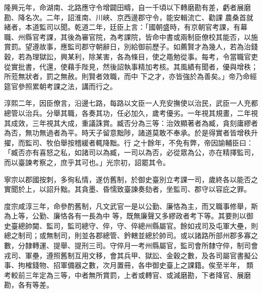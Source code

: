\begin{pinyinscope}
 隆興元年，命湖南、北路應守令增闢田疇，自一千頃以下轉磨勘有差，虧者展磨勘、降名次。二年，詔淮南、川峽、京西邊郡守令，能安輯流亡、勸課
 農桑首就緒者，本道監司以聞。乾道二年，廷臣上言：「國朝盛時，有京朝官考課，有幕職、州縣官考課，其後為審官院，為考課院，皆命中書或兩制臣僚校其能否，以施賞罰。望遵故事，應監司郡守朝辭日，別給御前歷子。如薦賢才為幾人，若為治錢穀，若為理獄訟，興某利，除某害，各為條目，使之黽勉從事。每考，令當職官吏從實批書，代還，使藉手陛見，然後詔執事精加考核。其風績有聞者，優與增秩；所蒞無狀者，罰之無赦。則賢者效職，而中
 下之才，亦皆強於為善矣。」帝乃命經筵官參照累朝考課之法，講而行之。



 淳熙二年，因臣僚言，沿邊七路，每路以文臣一人充安撫使以治民，武臣一人充都總管以治兵。分舉其職，各奏其功，任必加久，歲考優劣。一年視其規畫，二年視其成效，三年視其大成，重議誅賞。臧否分為三等：治效顯著者為臧，貪刻庸繆者為否，無功無過者為平。時天子留意黜陟，諸道莫敢不奉承。於是得實者皆增秩升擢，而監司、牧伯舉按稽緩者輒降黜。行
 之十餘年，不免有弊，帝因諭輔臣曰：「臧否亦有喜怒之私，如諸司以為臧，一司以為否，必從眾為公，亦在精擇監司，而以臺諫考察之，庶乎其可也。」光宗初，詔罷其令。



 寧宗以郡國按刺，多徇私情，遂仿舊制，於御史臺別立考課一司，歲終各以能否之實聞於上，以詔升黜。其貪墨、昏懦致臺諫奏劾者，坐監司、郡守以容庇之罪。



 度宗咸淳三年，命參酌舊制，凡文武官一是以公勤、廉恪為主，而又職事修舉，斯為上等，公勤、廉恪各有一長為中
 等，既無廉聲又多繆政者考下等。其要則以御史臺總帥閫、監司，監司總守、倅，守、倅總州縣屬官。餘如戎司及屯軍大壘，則總之制司；或無制司，則並各郡總管、鈐轄並總於帥司。或以諸路所部州郡多寡之數，分隸轉運、提舉、提刑三司。守倅月一考州縣屬官，監司會所隸守倅，制司會戎司、軍壘，遵照舊制互用文移，會其兵甲、獄訟、金穀之數，及各司屬官書擬公事、拘榷錢物、招軍備器之數，次月置冊，各申御史臺上之課籍。俟至半年，
 類考較前三年定為三等，中者無所賞罰，上者或轉官、或減磨勘，下者降官、展磨勘，各有等差。



\end{pinyinscope}